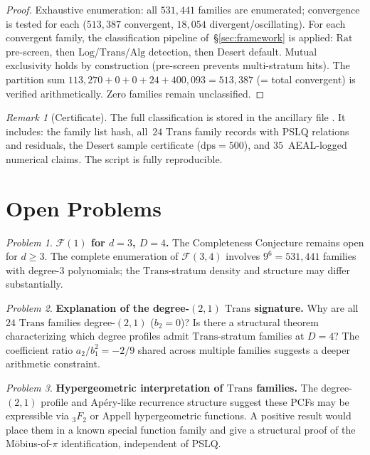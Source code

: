 \documentclass{amsart}
\theoremstyle{definition}
\theoremstyle{remark}
\newtheorem{remark}[theorem]{Remark}
\newtheorem{problem}{Problem}
\newcommand{\FF}{\mathcal{F}}
\newcommand{\Rat}{\mathrm{Rat}}
\newcommand{\Log}{\mathrm{Log}}
\newcommand{\Alg}{\mathrm{Alg}}
\newcommand{\Trans}{\mathrm{Trans}}
\newcommand{\dps}{\mathrm{dps}}
\begin{document}
\begin{proof}
Exhaustive enumeration: all $531{,}441$ families are enumerated;
convergence is tested for each ($513{,}387$ convergent, $18{,}054$
divergent/oscillating).  For each convergent family, the classification
pipeline of~\S\ref{sec:framework} is applied: $\Rat$ pre-screen, then
$\Log$/$\Trans$/$\Alg$ detection, then Desert default.  Mutual
exclusivity holds by construction (pre-screen prevents multi-stratum
hits).  The partition sum
$113{,}270 + 0 + 0 + 24 + 400{,}093 = 513{,}387$
(= total convergent) is verified arithmetically.  Zero families
remain unclassified.
\end{proof}

\begin{remark}[Certificate]\label{rem:cert}
The full classification is stored in the
ancillary file .
It includes: the family list hash,
all~$24$ $\Trans$ family records with PSLQ
relations and residuals, the Desert sample
certificate ($\dps = 500$), and $35$~AEAL-logged
numerical claims.  The script
is fully reproducible.
\end{remark}

\section{Open Problems}\label{sec:open}

\begin{problem}\label{prob:d3}
\textbf{$\FF(1)$ for $d=3$, $D=4$.}
The Completeness Conjecture remains open for $d \ge 3$.  The complete
enumeration of $\FF(3,4)$ involves $9^6 = 531{,}441$ families with
degree-$3$ polynomials; the $\Trans$-stratum density and structure may
differ substantially.
\end{problem}

\begin{problem}\label{prob:deg21open}
\textbf{Explanation of the degree-$(2,1)$ $\Trans$ signature.}
Why are all $24$ $\Trans$ families degree-$(2,1)$ ($b_2 = 0$)?  Is there
a structural theorem characterizing which degree profiles admit
$\Trans$-stratum families at $D = 4$?  The coefficient ratio
$a_2/b_1^2 = -2/9$ shared across multiple families suggests a deeper
arithmetic constraint.
\end{problem}

\begin{problem}\label{prob:hyp}
\textbf{Hypergeometric interpretation of $\Trans$ families.}
The degree-$(2,1)$ profile and Ap\'ery-like recurrence structure suggest
these PCFs may be expressible via ${}_3F_2$ or Appell hypergeometric
functions.  A positive result would place them in a known special function
family and give a structural proof of the M\"obius-of-$\pi$
identification, independent of PSLQ.
\end{problem}
\end{document}
